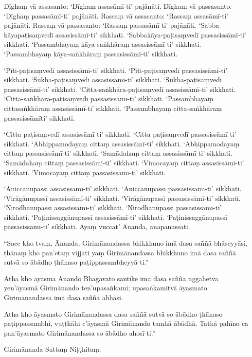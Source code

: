 Dīghaṃ vā assasanto: ‘Dīghaṃ assasāmī-ti’ pajānāti. Dīghaṃ vā passasanto:
‘Dīghaṃ passasāmī-ti’ pajānāti. Rassaṃ vā assasanto: ‘Rassaṃ assasāmī-ti’
pajānāti. Rassaṃ vā passasanto: ‘Rassaṃ passasāmī-ti’ pajānāti.
‘Sabba-kāyapaṭisaṃvedī assasissāmī-ti’ sikkhati. ‘Sabbakāya-paṭisaṃvedī
passasissāmī-ti’ sikkhati. ‘Passambhayaṃ kāya-saṅkhāraṃ assasissāmī-ti’
sikkhati. ‘Passambhayaṃ kāya-saṅkhāraṃ passasissāmī-ti’ sikkhati.

‘Pīti-paṭisaṃvedī assasissāmī-ti’ sikkhati. ‘Pīti-paṭisaṃvedī passasissāmī-ti’
sikkhati. ‘Sukha-paṭisaṃvedī assasissāmī-ti’ sikkhati. ‘Sukha-paṭisaṃvedī
passasissāmī-ti’ sikkhati. ‘Citta-saṅkhāra-paṭisaṃvedī assasissāmī-ti’ sikkhati.
‘Citta-saṅkhāra-paṭisaṃvedī passasissāmī-ti’ sikkhati. ‘Passambhayaṃ
cittasaṅkhāraṃ assasissāmī-ti’ sikkhati. ‘Passambhayaṃ citta-saṅkhāraṃ
passasissāmīti’ sikkhati.

‘Citta-paṭisaṃvedī assasissāmī-ti’ sikkhati. ‘Citta-paṭisaṃvedī passasissāmī-ti’
sikkhati. ‘Abhippamodayaṃ cittaṃ assasissāmī-ti’ sikkhati. ‘Abhippamodayaṃ
cittaṃ passasissāmī-ti’ sikkhati. ‘Samādahaṃ cittaṃ assasissāmī-ti’ sikkhati.
‘Samādahaṃ cittaṃ passasissāmī-ti’ sikkhati. ‘Vimocayaṃ cittaṃ assasissāmī-ti’
sikkhati. ‘Vimocayaṃ cittaṃ passasissāmī-ti’ sikkhati.

‘Aniccānupassī assasissāmī-ti’ sikkhati. ‘Aniccānupassī passasissāmī-ti’
sikkhati. ‘Virāgānupassī assasissāmī-ti’ sikkhati. ‘Virāgānupassī
passasissāmī-ti’ sikkhati. ‘Nirodhānupassī assasissāmī-ti’ sikkhati.
‘Nirodhānupassī passasissāmī-ti’ sikkhati. ‘Paṭinissaggānupassī assasissāmī-ti’
sikkhati. ‘Paṭinissaggānupassī passasissāmī-ti’ sikkhati. Ayaṃ vuccat’ Ānanda,
ānāpānassati.

“Sace kho tvaṃ, Ānanda, Girimānandassa bhikkhuno imā dasa saññā bhāseyyāsi,
ṭhānaṃ kho pan’etaṃ vijjati yaṃ Girimānandassa bhikkhuno imā dasa saññā sutvā so
ābādho ṭhānaso paṭippassambheyyā-ti.”

Atha kho āyasmā Ānando Bhagavato santike imā dasa saññā uggahetvā yen’āyasmā
Girimānando ten’upasaṅkami; upasaṅkamitvā āyasmato Girimānandassa imā dasa saññā
abhāsi.

Atha kho āyasmato Girimānandassa dasa saññā sutvā so ābādho ṭhānaso
paṭippassambhi, vuṭṭhāhi c’āyasmā Girimānando tamhā ābādhā. Tathā pahīno ca
pan’āyasmato Girimānandassa so ābādho ahosī-ti.”

Girimānanda Suttaṃ Niṭṭhitaṃ.


